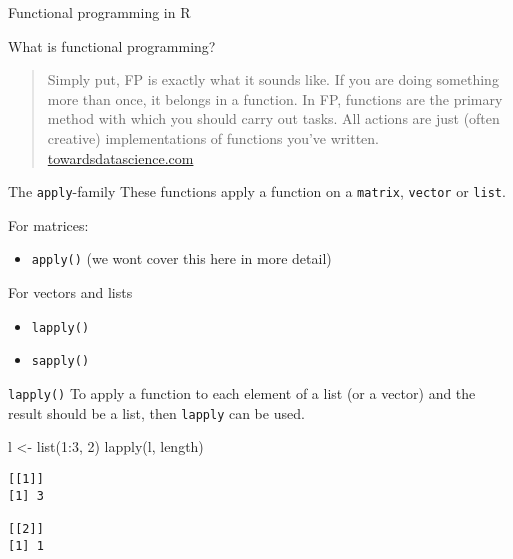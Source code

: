 \documentclass[ignorenonframetext,,t]{beamer}
\providecommand{\tightlist}{%
\setlength{\itemsep}{0pt}\setlength{\parskip}{0pt}}
\newenvironment{Shaded}{\begin{snugshade}}{\end{snugshade}}
\newcommand{\DecValTok}[1]{\textcolor[rgb]{0.00,0.00,0.81}{#1}}
\newcommand{\FunctionTok}[1]{\textcolor[rgb]{0.00,0.00,0.00}{#1}}
\newcommand{\NormalTok}[1]{#1}
\newcommand{\OtherTok}[1]{\textcolor[rgb]{0.56,0.35,0.01}{#1}}
\newcommand{\SpecialCharTok}[1]{\textcolor[rgb]{0.00,0.00,0.00}{#1}}
\providecommand{\tightlist}{%
\setlength{\itemsep}{0pt}\setlength{\parskip}{0pt}}
\renewcommand{\tightlist}{\setlength{\itemsep}{1.4ex}\setlength{\parskip}{0pt}}
\begin{document}
\begin{frame}{Functional programming in R}
\protect\hypertarget{functional-programming-in-r}{}
\begin{block}{What is functional programming?}
\protect\hypertarget{what-is-functional-programming}{}
\begin{quote}
Simply put, FP is exactly what it sounds like. If you are doing
something more than once, it belongs in a function. In FP, functions are
the primary method with which you should carry out tasks. All actions
are just (often creative) implementations of functions you've written.
\href{https://towardsdatascience.com/cleaner-r-code-with-functional-programming-adc37931ef7a}{towardsdatascience.com}
\end{quote}
\end{block}
\end{frame}

\begin{frame}[fragile]
\begin{block}{The \texttt{apply}-family}
\protect\hypertarget{the-apply-family}{}
These functions apply a function on a \texttt{matrix}, \texttt{vector}
or \texttt{list}.

For matrices:

\begin{itemize}
\tightlist
\item
  \texttt{apply()} (we wont cover this here in more detail)
\end{itemize}

For vectors and lists

\begin{itemize}
\tightlist
\item
  \texttt{lapply()}
\item
  \texttt{sapply()}
\end{itemize}
\end{block}
\end{frame}

\begin{frame}[fragile]
\begin{block}{\texttt{lapply()}}
\protect\hypertarget{lapply}{}
To apply a function to each element of a list (or a vector) and the
result should be a list, then \texttt{lapply} can be used.

\begin{Shaded}
\begin{Highlighting}[]
\NormalTok{l }\OtherTok{\textless{}{-}} \FunctionTok{list}\NormalTok{(}\DecValTok{1}\SpecialCharTok{:}\DecValTok{3}\NormalTok{, }\DecValTok{2}\NormalTok{)}
\FunctionTok{lapply}\NormalTok{(l, length)}
\end{Highlighting}
\end{Shaded}

\begin{verbatim}
[[1]]
[1] 3

[[2]]
[1] 1
\end{verbatim}
\end{block}
\end{frame}
\end{document}
